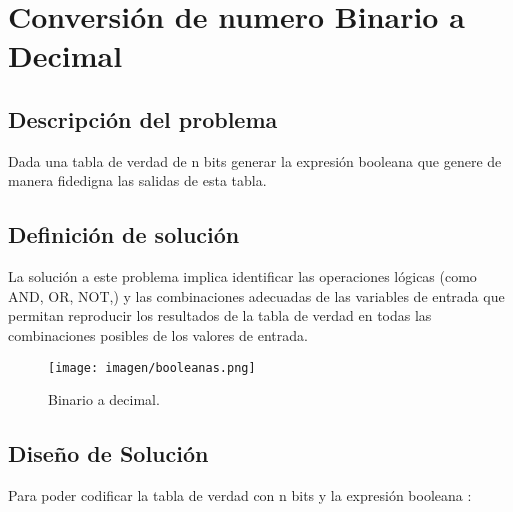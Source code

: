 \section{Conversión de numero Binario a Decimal}

\subsection{Descripción del problema}

Dada una tabla de verdad de n bits generar la expresión booleana que genere de manera fidedigna las salidas de esta tabla. 

\subsection{Definición  de solución}

La solución a este problema implica identificar las operaciones lógicas (como AND, OR, NOT,) y las combinaciones adecuadas de las variables de entrada que permitan reproducir los resultados de la tabla de verdad en todas las combinaciones posibles de los valores de entrada.

\begin {figure}[h!]
\centerline{\texttt{[image: imagen/booleanas.png]}}
\caption{Binario a decimal.}
\label{fig}
\end {figure}

\subsection{Diseño de Solución}

Para poder codificar la  tabla de verdad  con n bits y la expresión booleana :

